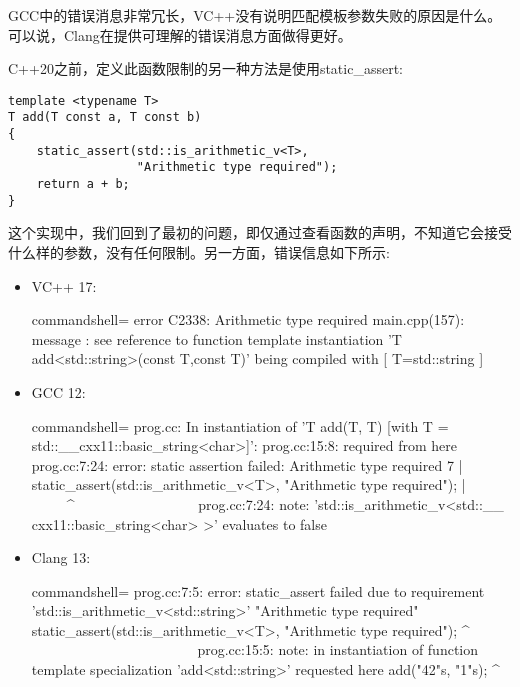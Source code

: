 GCC中的错误消息非常冗长，VC++没有说明匹配模板参数失败的原因是什么。可以说，Clang在提供可理解的错误消息方面做得更好。

C++20之前，定义此函数限制的另一种方法是使用static\_assert:

\begin{lstlisting}[style=styleCXX]
template <typename T>
T add(T const a, T const b)
{
	static_assert(std::is_arithmetic_v<T>,
				  "Arithmetic type required");
	return a + b;
}
\end{lstlisting}

这个实现中，我们回到了最初的问题，即仅通过查看函数的声明，不知道它会接受什么样的参数，没有任何限制。另一方面，错误信息如下所示:

\begin{itemize}
\item
VC++ 17:

\begin{tcblisting}{commandshell={}}
error C2338: Arithmetic type required
main.cpp(157): message : see reference to function
template instantiation 'T add<std::string>(const T,const
T)' being compiled
     with
     [
         T=std::string
     ]
\end{tcblisting}

\item
GCC 12:

\begin{tcblisting}{commandshell={}}
prog.cc: In instantiation of 'T add(T, T) [with T =
std::__cxx11::basic_string<char>]':
prog.cc:15:8: required from here
prog.cc:7:24: error: static assertion failed: Arithmetic
type required
    7 | static_assert(std::is_arithmetic_v<T>,
"Arithmetic type required");
      |                         ~~~~~^~~~~~~~~~~~~~~~~~
prog.cc:7:24: note: 'std::is_arithmetic_v<std::__
cxx11::basic_string<char> >' evaluates to false
\end{tcblisting}

\item
Clang 13:

\begin{tcblisting}{commandshell={}}
prog.cc:7:5: error: static_assert failed due to
requirement 'std::is_arithmetic_v<std::string>'
"Arithmetic type required"
     static_assert(std::is_arithmetic_v<T>, "Arithmetic
type required");
     ^ ~~~~~~~~~~~~~~~~~~~~~~~
prog.cc:15:5: note: in instantiation of function template
specialization 'add<std::string>' requested here
    add("42"s, "1"s);
    ^
\end{tcblisting}
\end{itemize}

